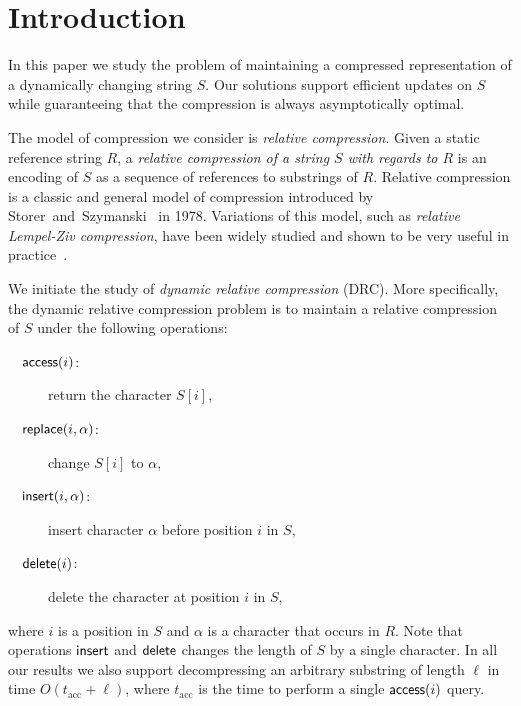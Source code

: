 \section{Introduction}
In this paper we study the problem of maintaining a compressed representation of a dynamically changing string $S$. Our solutions support efficient updates on $S$ while guaranteeing that the compression is always asymptotically optimal.

The model of compression we consider is \emph{relative compression}. Given a static reference string $R$, a \emph{relative compression of a string $S$ with regards to $R$} is an encoding of $S$ as a sequence of references to substrings of $R$. Relative compression is a classic and general model of compression introduced by Storer~and~Szymanski~\cite{SS1978,Storer1982} in 1978. Variations of this model, such as \emph{relative Lempel-Ziv compression}, have been widely studied and shown to be very useful in practice~\cite{kuruppu2010relative, kuruppu2011optimized, chern2012reference, do2014fast, hoobin2011relative}.

We initiate the study of \emph{dynamic relative compression} (DRC). More specifically, the dynamic relative compression problem is to maintain a relative compression of $S$ under the following operations:

\begin{description}
\item[$\quad\mathsf{access}(i)$:] return the character $S[i]$,
\item[$\quad\mathsf{replace}(i, \alpha)$:] change $S[i]$ to $\alpha$,
\item[$\quad\mathsf{insert}(i, \alpha)$:] insert character $\alpha$ before position $i$ in $S$,
\item[$\quad\mathsf{delete}(i)$: ] delete the character at position $i$ in $S$,
\end{description}
where $i$ is a position in $S$ and $\alpha$ is a character that occurs in $R$. Note that operations $\mathsf{insert}$ and $\mathsf{delete}$ changes the length of $S$ by a single character. In all our results we also support decompressing an arbitrary substring of length $\ell$ in time $O(t_\text{acc}+\ell)$, where $t_\text{acc}$ is the time to perform a single $\mathsf{access}(i)$ query.


